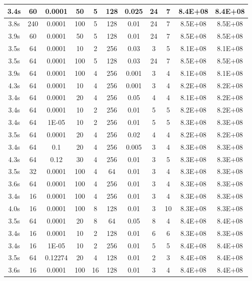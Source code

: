\begin{longtable}{|c|c|c|c|c|c|c|c|c|c|c|}
3.4s & 60 & 0.0001 & 50 & 5 & 128 & 0.025 & 24 & 7 & 8.4E+08 & 8.4E+08 \\ \hline
3.8s & 240 & 0.0001 & 100 & 5 & 128 & 0.01 & 24 & 7 & 8.5E+08 & 8.5E+08 \\ \hline
3.9s & 60 & 0.0001 & 50 & 5 & 128 & 0.01 & 24 & 7 & 8.5E+08 & 8.5E+08 \\ \hline
3.5s & 64 & 0.0001 & 10 & 2 & 256 & 0.03 & 3 & 5 & 8.1E+08 & 8.1E+08 \\ \hline
3.5s & 64 & 0.0001 & 100 & 5 & 128 & 0.03 & 24 & 7 & 8.5E+08 & 8.5E+08 \\ \hline
3.9s & 64 & 0.0001 & 100 & 4 & 256 & 0.001 & 3 & 4 & 8.1E+08 & 8.1E+08 \\ \hline
4.3s & 64 & 0.0001 & 10 & 4 & 256 & 0.001 & 3 & 4 & 8.2E+08 & 8.2E+08 \\ \hline
3.4s & 64 & 0.0001 & 20 & 4 & 256 & 0.05 & 4 & 4 & 8.1E+08 & 8.2E+08 \\ \hline
3.4s & 64 & 0.0001 & 10 & 2 & 256 & 0.01 & 5 & 5 & 8.2E+08 & 8.2E+08 \\ \hline
3.4s & 64 & 1E-05 & 10 & 2 & 256 & 0.01 & 5 & 5 & 8.3E+08 & 8.3E+08 \\ \hline
3.5s & 64 & 0.0001 & 20 & 4 & 256 & 0.02 & 4 & 4 & 8.2E+08 & 8.2E+08 \\ \hline
3.4s & 64 & 0.1 & 20 & 4 & 256 & 0.005 & 3 & 4 & 8.3E+08 & 8.3E+08 \\ \hline
4.3s & 64 & 0.12 & 30 & 4 & 256 & 0.01 & 3 & 5 & 8.3E+08 & 8.3E+08 \\ \hline
3.5s & 32 & 0.0001 & 100 & 4 & 64 & 0.01 & 3 & 4 & 8.3E+08 & 8.3E+08 \\ \hline
3.6s & 64 & 0.0001 & 100 & 4 & 256 & 0.01 & 3 & 4 & 8.3E+08 & 8.3E+08 \\ \hline
3.4s & 16 & 0.0001 & 100 & 4 & 256 & 0.01 & 3 & 4 & 8.3E+08 & 8.3E+08 \\ \hline
4.0s & 16 & 0.0001 & 100 & 8 & 128 & 0.01 & 3 & 10 & 8.3E+08 & 8.3E+08 \\ \hline
3.5s & 64 & 0.0001 & 20 & 8 & 64 & 0.05 & 8 & 4 & 8.4E+08 & 8.4E+08 \\ \hline
3.4s & 16 & 0.0001 & 10 & 2 & 128 & 0.01 & 6 & 6 & 8.3E+08 & 8.3E+08 \\ \hline
3.4s & 16 & 1E-05 & 10 & 2 & 256 & 0.01 & 5 & 5 & 8.4E+08 & 8.4E+08 \\ \hline
3.5s & 64 & 0.12274 & 20 & 4 & 128 & 0.01 & 2 & 3 & 8.4E+08 & 8.4E+08 \\ \hline
3.6s & 16 & 0.0001 & 100 & 16 & 128 & 0.01 & 3 & 4 & 8.4E+08 & 8.4E+08 \\ \hline

\end{longtable}
